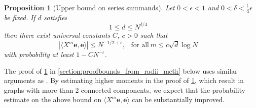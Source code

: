 \documentclass[11pt]{article}
\newcommand{\abs}[1]{\left| #1 \right|}
\theoremstyle{plain}
\newtheorem{prop}{Proposition}[section]
\theoremstyle{remark}
\numberwithin{equation}{section}
\newcommand{\nc}{\normalcolor}
\begin{document}
\nc 

\begin{prop}[Upper bound on series summands] \label{prop:bounds_from_radii_meth}
Let $ 0 < \epsilon <1$ and $0 < \delta < \frac{1}{4} \epsilon$ be fixed. 
If $d$ satisfies 
\begin{equation}\label{eq:regimed3}
   1 \le d \le N^{\delta/4}
\end{equation}
then there exist universal constants $C$, $c>0$ such that
    \begin{equation*}
       \abs{ \langle X^{m}\mathbf{e}, \mathbf{e}\rangle } \le N^{-1/2 + \epsilon} , ~~ \text{ for all}~ m \le c \sqrt{d}\log N
    \end{equation*}
    with probability at least $1 - CN^{-\epsilon}$.
\end{prop}
The proof of \cref{prop:bounds_from_radii_meth} in \cref{section:proofbounds_from_radii_meth} below uses similar arguments as \cite[Sections 5.1 and 6]{BBK_spec_radii}. By estimating higher moments in the proof of \cref{prop:bounds_from_radii_meth}, which result in graphs with more than 2 connected components,  
we expect that the probability estimate on the above bound on $\langle X^{m}\mathbf{e}, \mathbf{e}\rangle$ 
can be substantially improved. 
\end{document}
